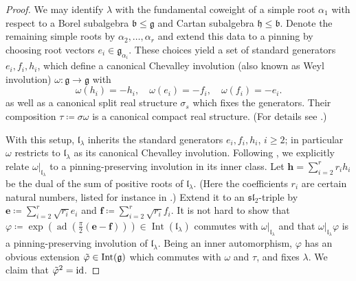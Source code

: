 \documentclass{amsart}
\newcommand{\ad}{\operatorname{ad}}
\renewcommand{\b}{\mathfrak{b}}
\newcommand{\g}{\mathfrak{g}}
\newcommand{\h}{\mathfrak{h}}
\newcommand{\id}{\operatorname{id}}
\newcommand{\Int}{\operatorname{Int}}
\newcommand{\el}{\mathfrak{l}}
\renewcommand{\sl}{\mathfrak{sl}}
\theoremstyle{definition}
\theoremstyle{plain}
\theoremstyle{remark}
\begin{document}
\begin{proof}
    We may identify $\lambda$ with the fundamental coweight of a simple root $\alpha_1$ with respect to a Borel subalgebra $\b\le \g$ and Cartan subalgebra $\h\le \b$. Denote the remaining simple roots by $\alpha_2,\ldots, \alpha_r$ and extend this data to a pinning by choosing root vectors $e_i\in \g_{\alpha_i}$. These choices yield a set of standard generators $e_i,f_i,h_i$, which define a canonical Chevalley involution (also known as Weyl involution) $\omega\colon \g\to \g$ with
    $$
        \omega(h_i) = -h_i,
        \quad
        \omega(e_i) = - f_i,
        \quad
        \omega(f_i) = - e_i.
    $$
    as well as a canonical split real structure $\sigma_s$ which fixes the generators. Their composition $\tau\coloneqq \sigma\omega$ is a canonical compact real structure. (For details see \cite[p.\,18]{Onishchik2004_real}.)

    With this setup, $\el_\lambda$ inherits the standard generators $e_i, f_i, h_i$, $i\ge 2$; in particular $\omega$ restricts to $\el_\lambda$ as its canonical Chevalley involution. Following \cite[ch.\,4]{Onishchik2004_real}, we explicitly relate $\omega|_{\el_\lambda}$ to a pinning-preserving involution in its inner class. Let $\mathbf{h} = \sum_{i=2}^r r_i h_i$ be the dual of the sum of positive roots of $\el_\lambda$. (Here the coefficients $r_i$ are certain natural numbers, listed for instance in \cite[p. 78, Table 4]{Onishchik2004_real}.) Extend it to an $\sl_2$-triple by $\mathbf{e}\coloneqq \sum_{i=2}^r \sqrt{r_i}e_i$ and $\mathbf{f}\coloneqq \sum_{i=2}^r \sqrt{r_i}f_i$. It is not hard to show that $\varphi \coloneqq \exp(\ad(\tfrac{\pi}{2}(\mathbf{e}-\mathbf{f}))) \in \Int(\el_\lambda)$ commutes with $\omega|_{\el_\lambda}$ and that $\omega|_{\el_\lambda} \varphi$ is a pinning-preserving involution of $\el_\lambda$. Being an inner automorphism, $\varphi$ has an obvious extension $\Tilde{\varphi}\in \Int(\g)$ which commutes with $\omega$ and $\tau$, and fixes $\lambda$. We claim that $\Tilde{\varphi}^2 = \id$.  


\end{proof}
\end{document}
